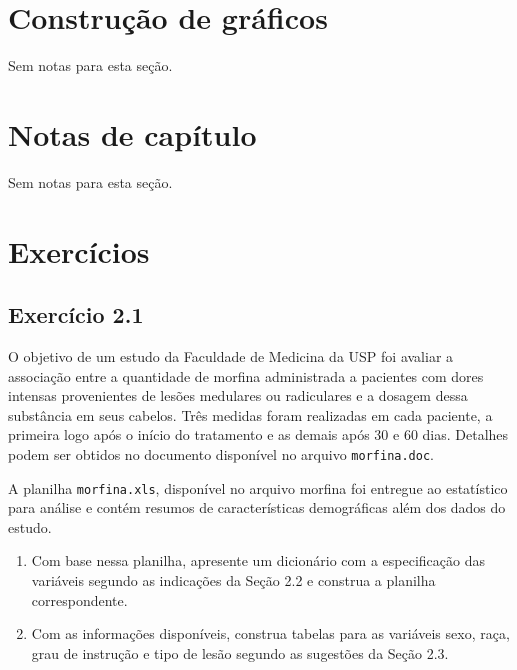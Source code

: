 \documentclass[
]{latex/krantz}
\providecommand{\tightlist}{%
  \setlength{\itemsep}{0pt}\setlength{\parskip}{0pt}}
\theoremstyle{definition}
\theoremstyle{definition}
\theoremstyle{definition}
\theoremstyle{definition}
\theoremstyle{remark}
\begin{document}
\hypertarget{construuxe7uxe3o-de-gruxe1ficos}{%
\section{Construção de gráficos}\label{construuxe7uxe3o-de-gruxe1ficos}}

Sem notas para esta seção.

\hypertarget{notas-de-capuxedtulo}{%
\section{Notas de capítulo}\label{notas-de-capuxedtulo}}

Sem notas para esta seção.

\hypertarget{exercuxedcios}{%
\section{Exercícios}\label{exercuxedcios}}

\hypertarget{exr2-1}{%
\subsection*{Exercício 2.1}\label{exr2-1}}

O objetivo de um estudo da Faculdade de Medicina da USP foi avaliar a associação entre a quantidade de morfina administrada a pacientes com dores intensas provenientes de lesões medulares ou radiculares e a dosagem dessa substância em seus cabelos. Três medidas foram realizadas em cada paciente, a primeira logo após o início do tratamento e as demais após 30 e 60 dias. Detalhes podem ser obtidos no documento disponível no arquivo \texttt{morfina.doc}.

A planilha \texttt{morfina.xls}, disponível no arquivo morfina foi entregue ao estatístico para análise e contém resumos de características demográficas além dos dados do estudo.

\begin{enumerate}
\def\labelenumi{\alph{enumi})}
\tightlist
\item
  Com base nessa planilha, apresente um dicionário com a especificação das variáveis segundo as indicações da Seção 2.2 e construa a planilha correspondente.
\item
  Com as informações disponíveis, construa tabelas para as variáveis sexo, raça, grau de instrução e tipo de lesão segundo as sugestões da Seção 2.3.
\end{enumerate}
\end{document}
